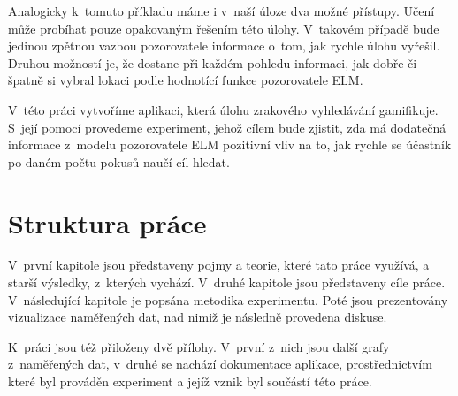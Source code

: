 Analogicky k~tomuto příkladu máme i v~naší úloze dva možné přístupy.
Učení může probíhat pouze opakovaným řešením této úlohy. V~takovém případě bude
jedinou zpětnou vazbou pozorovatele informace o~tom, jak rychle úlohu vyřešil. Druhou možností je,
že dostane při každém pohledu informaci, jak dobře či špatně si vybral lokaci podle
hodnotící funkce pozorovatele ELM.

V~této práci vytvoříme aplikaci, která úlohu zrakového vyhledávání gamifikuje.
S~její pomocí provedeme experiment, jehož cílem bude zjistit, zda má dodatečná
informace z~modelu pozorovatele ELM pozitivní vliv na to, jak rychle se
účastník po daném počtu pokusů naučí cíl hledat.




\section*{Struktura práce}

V~první kapitole jsou představeny pojmy a teorie, které tato
práce využívá, a starší výsledky, z~kterých vychází. V~druhé kapitole jsou představeny cíle práce. V~následující
kapitole je popsána metodika experimentu. Poté jsou prezentovány vizualizace
naměřených dat, nad nimiž je následně provedena diskuse. 

K~práci jsou též
přiloženy dvě přílohy. V~první z~nich jsou další grafy z~naměřených dat,
v~druhé se nachází dokumentace aplikace, prostřednictvím které byl prováděn
experiment a jejíž vznik byl součástí této práce.

